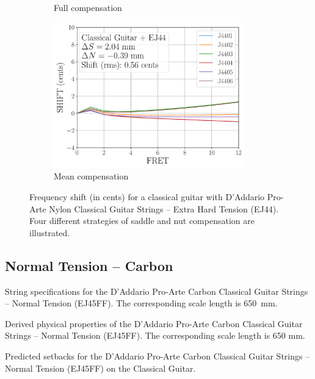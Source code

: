 \begin{figure}
\begin{subfigure}[b]{0.45\textwidth}
   \caption{Full compensation}
   \label{fig:shift_classicalguitar_ej44_full}
  \end{subfigure}
  \hspace{0.25in}
  \begin{subfigure}[b]{0.45\textwidth}
   \centering
   \includegraphics[width=3.25in]{figures/shift_classicalguitar_ej44_mean}
   \caption{Mean compensation}
   \label{fig:shift_classicalguitar_ej44_mean}
  \end{subfigure}
  \caption{\label{fig:compensation_classicalguitar_ej44} Frequency shift (in cents) for a classical guitar with D'Addario Pro-Arte Nylon Classical Guitar Strings -- Extra Hard Tension (EJ44). Four different strategies of saddle and nut compensation are illustrated.}
 \end{figure}

 \newpage
 \subsection{Normal Tension -- Carbon}
 
 \begin{table}[htbp]
   \centering
   \caption{\label{tbl:ej45ff_mks} String specifications for the D'Addario Pro-Arte Carbon Classical Guitar Strings -- Normal Tension (EJ45FF). The corresponding scale length is 650~mm.}
   
 \end{table}%
 
 \begin{table}[htbp]
   \centering
   \caption{\label{tbl:ej45ff_props} Derived physical properties of the D'Addario Pro-Arte Carbon Classical Guitar Strings -- Normal Tension (EJ45FF). The corresponding scale length is 650 mm.}
   
 \end{table}%
 
 \begin{table}[htbp]
   \centering
   \caption{\label{tbl:ej45ff_setbacks} Predicted setbacks for the D'Addario Pro-Arte Carbon Classical Guitar Strings -- Normal Tension (EJ45FF) on the Classical Guitar.}
   
 \end{table}%
 
